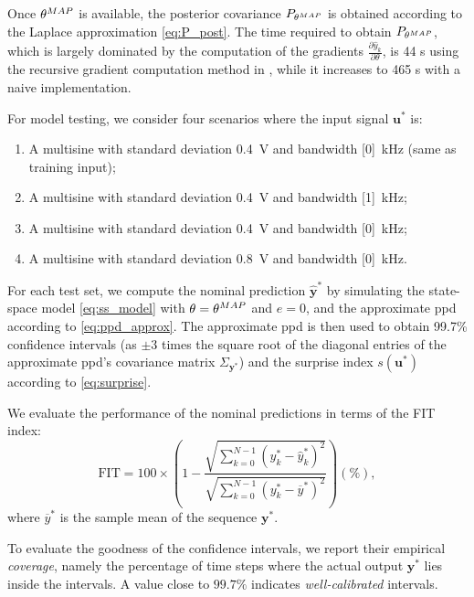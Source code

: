 \documentclass{ifacconf}
\newcommand{\nsamp}{N}
\newcommand{\MAP}{{\rm MAP}}
\newcommand{\tvec}[1]{{\mathbf{#1}}}
\newcommand{\mean}[1]{\hat{#1}}
\begin{document}
Once $\theta^\MAP$ is available, the posterior covariance $P_{\theta^\MAP}$ is obtained according to the Laplace approximation \eqref{eq:P_post}. The time required to obtain $P_{\theta^\MAP}$, which is largely dominated by the computation of the gradients $\frac{\partial \mean{y}_k}{\partial \theta}$, is  44 s using the recursive gradient computation method in \cite{forgione2022adaptation}, while it increases to 465 s with a naive implementation.

For model testing, we consider four  scenarios where the input signal $\tvec{u}^*$ is:
\begin{enumerate}
 \item A multisine with standard deviation 0.4~V and bandwidth [0]~kHz (same as training input);
 \item A multisine with standard deviation 0.4~V and bandwidth [1]~kHz;
 \item A multisine with standard deviation 0.4~V and bandwidth [0]~kHz;
 \item A multisine with standard deviation 0.8~V and bandwidth [0]~kHz.
 \end{enumerate}
 For each test set, we compute the nominal prediction $\mean{\tvec{y}}^*$ by simulating the state-space model \eqref{eq:ss_model} with $\theta=\theta^\MAP$ and  $e=0$, and the approximate ppd according to \eqref{eq:ppd_approx}. The approximate ppd is then used to obtain 99.7\% confidence intervals (as $\pm 3$ times the square root of the diagonal entries of the approximate ppd's covariance matrix $\Sigma_{\tvec{y}^*}$) and the surprise index $s(\tvec{u}^*)$ according to \eqref{eq:surprise}.

 
We evaluate the performance of the nominal predictions in terms of the FIT index:
\begin{equation}
\label{eq:fit_index}
\mathrm{FIT} = 100 \times \left(1- \frac{\sqrt{\sum_{k=0}^{\nsamp-1} \left({y}^*_k -  \mean{y}^*_k\right)^2} }  
{\sqrt{\sum_{k=0}^{\nsamp-1} \left({y}^*_k -  {\overline{y}^*}\right)^2}}\right) (\%),
\end{equation}
where ${\overline{y}^*}$ is the sample mean of the sequence $\tvec{y}^*$. %

To evaluate the goodness of the confidence intervals, we report their empirical \emph{coverage}, namely the percentage 
of time steps where the actual output $\tvec{y}^*$ lies inside the intervals. A value close to $99.7\%$ indicates \emph{well-calibrated} intervals.
\end{document}
